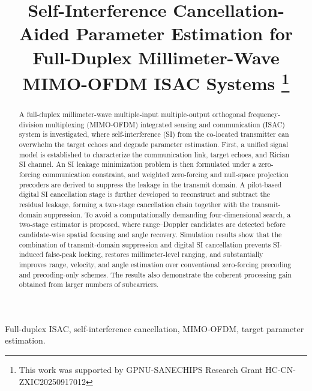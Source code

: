 \documentclass[conference]{IEEEtran}
\begin{document}
\title{Self-Interference Cancellation-Aided Parameter Estimation for Full-Duplex Millimeter-Wave MIMO-OFDM ISAC Systems
\thanks{This work was supported by GPNU-SANECHIPS Research Grant HC-CN-ZXIC20250917012}
}

\author{
}

\maketitle

\begin{abstract}
A full-duplex millimeter-wave multiple-input multiple-output orthogonal frequency-division multiplexing (MIMO-OFDM) integrated sensing and communication (ISAC) system is investigated, where self-interference (SI) from the co-located transmitter can overwhelm the target echoes and degrade parameter estimation. First, a unified signal model is established to characterize the communication link, target echoes, and Rician SI channel. An SI leakage minimization problem is then formulated under a zero-forcing communication constraint, and weighted zero-forcing and null-space projection precoders are derived to suppress the leakage in the transmit domain. A pilot-based digital SI cancellation stage is further developed to reconstruct and subtract the residual leakage, forming a two-stage cancellation chain together with the transmit-domain suppression. To avoid a computationally demanding four-dimensional search, a two-stage estimator is proposed, where range--Doppler candidates are detected before candidate-wise spatial focusing and angle recovery. Simulation results show that the combination of transmit-domain suppression and digital SI cancellation prevents SI-induced false-peak locking, restores millimeter-level ranging, and substantially improves range, velocity, and angle estimation over conventional zero-forcing precoding and precoding-only schemes. The results also demonstrate the coherent processing gain obtained from larger numbers of subcarriers.
\end{abstract}

\begin{IEEEkeywords}
Full-duplex ISAC, self-interference cancellation, MIMO-OFDM, target parameter estimation.
\end{IEEEkeywords}
\end{document}
